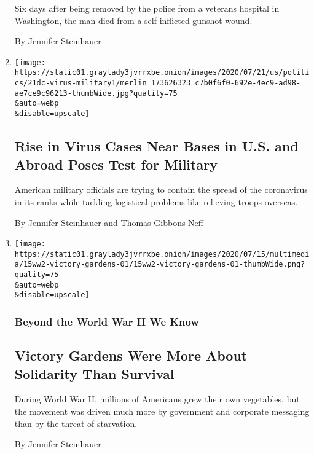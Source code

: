 \begin{enumerate}
  Six days after being removed by the police from a veterans hospital in
  Washington, the man died from a self-inflicted gunshot wound.

  By Jennifer Steinhauer
\item
  \href{/2020/07/21/us/politics/coronavirus-military.html}{}

  \texttt{[image: https://static01.graylady3jvrrxbe.onion/images/2020/07/21/us/politics/21dc-virus-military1/merlin\_173626323\_c7b0f6f0-692e-4ec9-ad98-ae7ce9c96213-thumbWide.jpg?quality=75\\\&auto=webp\\\&disable=upscale]}

  \hypertarget{rise-in-virus-cases-near-bases-in-us-and-abroad-poses-test-for-military}{%
  \subsection{Rise in Virus Cases Near Bases in U.S. and Abroad Poses
  Test for
  Military}\label{rise-in-virus-cases-near-bases-in-us-and-abroad-poses-test-for-military}}

  American military officials are trying to contain the spread of the
  coronavirus in its ranks while tackling logistical problems like
  relieving troops overseas.

  By Jennifer Steinhauer and Thomas Gibbons-Neff
\item
  \href{/2020/07/15/magazine/victory-gardens-world-war-II.html}{}

  \texttt{[image: https://static01.graylady3jvrrxbe.onion/images/2020/07/15/multimedia/15ww2-victory-gardens-01/15ww2-victory-gardens-01-thumbWide.png?quality=75\\\&auto=webp\\\&disable=upscale]}

  \hypertarget{beyond-the-world-war-ii-we-know}{%
  \subsubsection{Beyond the World War II We
  Know}\label{beyond-the-world-war-ii-we-know}}

  \hypertarget{victory-gardens-were-more-about-solidarity-than-survival}{%
  \subsection{Victory Gardens Were More About Solidarity Than
  Survival}\label{victory-gardens-were-more-about-solidarity-than-survival}}

  During World War II, millions of Americans grew their own vegetables,
  but the movement was driven much more by government and corporate
  messaging than by the threat of starvation.

  By Jennifer Steinhauer
\end{enumerate}

